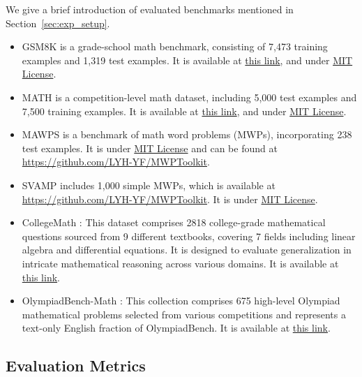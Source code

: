 We give a brief introduction of evaluated benchmarks mentioned in Section~\ref{sec:exp_setup}.
\begin{itemize}
    \item GSM8K \citep{gsm8k2021cobbe} is a grade-school math benchmark, consisting of 7,473 training examples and 1,319 test examples. It is available at \href{https://huggingface.co/datasets/openai/gsm8k}{this link}, and under \href{https://lbesson.mit-license.org/}{MIT License}.
    \item MATH \citep{MATH2021hendrycks} is a competition-level math dataset, including 5,000 test examples and 7,500 training examples. It is available at \href{https://huggingface.co/datasets/hendrycks/competition_math}{this link}, and under \href{https://lbesson.mit-license.org/}{MIT License}.
    \item MAWPS \citep{mawps2016koncel} is a benchmark of math word problems (MWPs), incorporating 238 test examples. 
    It is under \href{https://lbesson.mit-license.org/}{MIT License} and can be found at \href{https://github.com/LYH-YF/MWPToolkit}{https://github.com/LYH-YF/MWPToolkit}. 
    \item SVAMP \citep{SVAMP2021patel} includes 1,000 simple MWPs, which is available at \href{https://github.com/LYH-YF/MWPToolkit}{https://github.com/LYH-YF/MWPToolkit}. It is under \href{https://lbesson.mit-license.org/}{MIT License}.
    \item CollegeMath \citep{CollegeMath2024Tang}: This dataset comprises 2818 college-grade mathematical questions sourced from 9 different textbooks, covering 7 fields including linear algebra and differential equations. It is designed to evaluate generalization in intricate mathematical reasoning across various domains.
    It is available at \href{https://github.com/microsoft/unilm/tree/master/mathscale}{this link}.
    \item OlympiadBench-Math \citep{OlympiadBench2024He}: This collection comprises 675 high-level Olympiad mathematical problems selected from various competitions and represents a text-only English fraction of OlympiadBench.
    It is available at \href{https://github.com/OpenBMB/OlympiadBench}{this link}.
\end{itemize}

\subsection{Evaluation Metrics}\label{app:metric}

